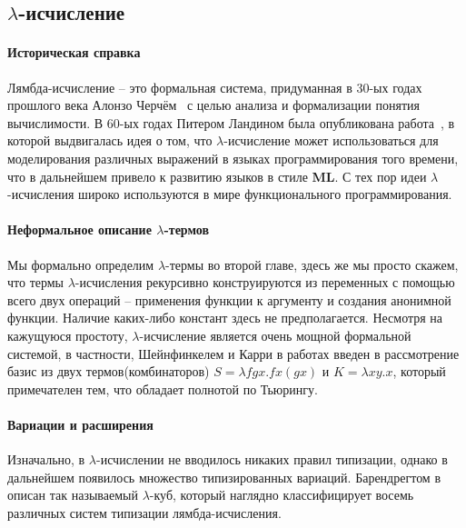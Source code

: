 \subsection{\texorpdfstring{$\lambda$}{Лямбда}-исчисление}
\label{sec:lambda}

\paragraph{Историческая справка}
Лямбда-исчисление -- это формальная система, придуманная в 30-ых годах прошлого века Алонзо Черчём~\cite{church1936unsolvable} с целью анализа и формализации понятия вычислимости. В 60-ых годах Питером Ландином была опубликована работа~\cite{landin1964mechanical}, в которой выдвигалась идея о том, что $\lambda$-исчисление может использоваться для моделирования различных выражений в языках программирования того времени, что в дальнейшем привело к развитию языков в стиле \textbf{ML}. С тех пор идеи $\lambda$-исчисления широко используются в мире функционального программирования.

\paragraph{Неформальное описание $\lambda$-термов}
Мы формально определим $\lambda$-термы во второй главе, здесь же мы просто скажем, что термы $\lambda$-исчисления рекурсивно конструируются из переменных с помощью всего двух операций -- применения функции к аргументу и создания анонимной функции. Наличие каких-либо констант здесь не предполагается. Несмотря на кажущуюся простоту, $\lambda$-исчисление является очень мощной формальной системой, в частности, Шейнфинкелем и Карри в работах \cite{schonfinkel1924bausteine, curry1930grundlagen} введен в рассмотрение базис из двух термов(комбинаторов) $S = \lambda f g x. f x (g x)$ и $K = \lambda x y. x$, который примечателен тем, что обладает полнотой по Тьюрингу.

\paragraph{Вариации и расширения}
Изначально, в $\lambda$-исчислении не вводилось никаких правил типизации, однако в дальнейшем появилось множество типизированных вариаций. Барендрегтом в~\cite{barendregt1993lambda} описан так называемый $\lambda$-куб, который наглядно классифицирует восемь различных систем типизации лямбда-исчисления.


